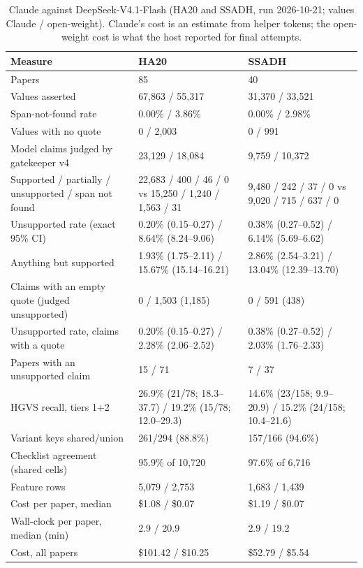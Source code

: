 \documentclass{article} %
\begin{document}
\begin{table}[!htbp]
\caption{Claude against DeepSeek-V4.1-Flash (HA20 and SSADH, run 2026-10-21; values Claude / open-weight). Claude's cost is an estimate from helper tokens; the open-weight cost is what the host reported for final attempts.}
\begin{center}
\scriptsize
\begin{tabularx}{\linewidth}{lYY}
\toprule
Measure & HA20 & SSADH \\
\midrule
Papers & 85 & 40 \\
Values asserted & 67,863 / 55,317 & 31,370 / 33,521 \\
Span-not-found rate & 0.00\% / 3.86\% & 0.00\% / 2.98\% \\
Values with no quote & 0 / 2,003 & 0 / 991 \\
Model claims judged by gatekeeper v4 & 23,129 / 18,084 & 9,759 / 10,372 \\
Supported / partially / unsupported / span not found & 22,683 / 400 / 46 / 0 vs 15,250 / 1,240 / 1,563 / 31 & 9,480 / 242 / 37 / 0 vs 9,020 / 715 / 637 / 0 \\
Unsupported rate (exact 95\% CI) & 0.20\% (0.15--0.27) / 8.64\% (8.24--9.06) & 0.38\% (0.27--0.52) / 6.14\% (5.69--6.62) \\
Anything but supported & 1.93\% (1.75--2.11) / 15.67\% (15.14--16.21) & 2.86\% (2.54--3.21) / 13.04\% (12.39--13.70) \\
Claims with an empty quote (judged unsupported) & 0 / 1,503 (1,185) & 0 / 591 (438) \\
Unsupported rate, claims with a quote & 0.20\% (0.15--0.27) / 2.28\% (2.06--2.52) & 0.38\% (0.27--0.52) / 2.03\% (1.76--2.33) \\
Papers with an unsupported claim & 15 / 71 & 7 / 37 \\
HGVS recall, tiers 1+2 & 26.9\% (21/78; 18.3--37.7) / 19.2\% (15/78; 12.0--29.3) & 14.6\% (23/158; 9.9--20.9) / 15.2\% (24/158; 10.4--21.6) \\
Variant keys shared/union & 261/294 (88.8\%) & 157/166 (94.6\%) \\
Checklist agreement (shared cells) & 95.9\% of 10,720 & 97.6\% of 6,716 \\
Feature rows & 5,079 / 2,753 & 1,683 / 1,439 \\
Cost per paper, median & \$1.08 / \$0.07 & \$1.19 / \$0.07 \\
Wall-clock per paper, median (min) & 2.9 / 20.9 & 2.9 / 19.2 \\
Cost, all papers & \$101.42 / \$10.25 & \$52.79 / \$5.54 \\
\bottomrule
\end{tabularx}
\end{center}
\end{table}
\end{document}
